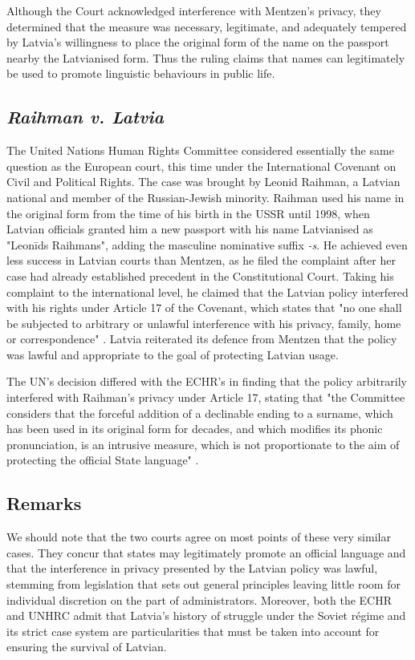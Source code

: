 Although the Court acknowledged interference with Mentzen's privacy, they
determined that the measure was necessary, legitimate, and adequately tempered
by Latvia's willingness to place the original form of the name on the passport
nearby the Latvianised form. Thus the ruling claims that names can legitimately
be used to promote linguistic behaviours in public life.

\subsection{\textit{Raihman v. Latvia}}

The United Nations Human Rights Committee considered essentially the
same question as the European court, this time under the International Covenant
on Civil and Political Rights. The case was brought by Leonid Raihman, a
Latvian national and member of the Russian-Jewish minority. Raihman used his
name in the original form from the time of his birth in the USSR until 1998,
when Latvian officials granted him a new passport with his name Latvianised as
"Leonīds Raihmans", adding the masculine nominative suffix \textit{-s}. He
achieved even less success in Latvian courts than Mentzen, as he filed the
complaint after her case had already established precedent in the
Constitutional Court. Taking his complaint to the international level, he
claimed that the Latvian policy interfered with his rights under Article 17 of
the Covenant, which states that "no one shall be subjected to arbitrary or
unlawful interference with his privacy, family, home or correspondence"
\parencite{iccpr}. Latvia reiterated its defence from Mentzen that the policy
was lawful and appropriate to the goal of protecting Latvian usage.

The UN's decision differed with the ECHR's in finding that the policy
arbitrarily interfered with Raihman's privacy under Article 17, stating that
"the Committee considers that the forceful addition of a declinable ending to a
surname, which has been used in its original form for decades, and which
modifies its phonic pronunciation, is an intrusive measure, which is not
proportionate to the aim of protecting the official State language"
\parencite[8.3]{raihman10}.

\subsection{Remarks}

We should note that the two courts agree on most points of these very similar
cases. They concur that states may legitimately promote an official language
and that the interference in privacy presented by the Latvian policy was
lawful, stemming from legislation that sets out general principles leaving
little room for individual discretion on the part of administrators. Moreover,
both the ECHR and UNHRC admit that Latvia's history of struggle under the
Soviet régime and its strict case system are particularities that must be taken
into account for ensuring the survival of Latvian.

